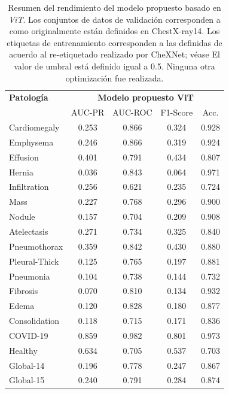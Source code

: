 {\begin{table}[tb]
    \centering
    \begin{tabular}{|l||c|c|c|c|}
        \hline
    {\bf Patología} 	    	&	\multicolumn{4}{c|}{\bf Modelo propuesto ViT}  \\
    \cline{2-5}
                        &	AUC-PR	&	AUC-ROC 	& F1-Score  & Acc.  \\
        \hline \hline
        Cardiomegaly	&	0.253	&	0.866	&	0.324	&	0.928	\\
        Emphysema	    &	0.246	&	0.866	&	0.319	&	0.924	\\
        Effusion	    &	0.401	&	0.791	&	0.434	&	0.807	\\
        Hernia	        &	0.036	&	0.843	&	0.064	&	0.971	\\
        Infiltration	&	0.256	&	0.621	&	0.235	&	0.724	\\
        Mass	        &	0.227	&	0.768	&	0.296	&	0.900	\\
        Nodule	        &	0.157	&	0.704	&	0.209	&	0.908	\\
        Atelectasis	    &	0.271	&	0.734	&	0.325	&	0.840	\\
        Pneumothorax	&	0.359	&	0.842	&	0.430	&	0.880	\\
        Pleural-Thick	&	0.125	&	0.765	&	0.197	&	0.881	\\
        Pneumonia	    &	0.104	&	0.738	&	0.144	&	0.732	\\
        Fibrosis	    &	0.070	&	0.810	&	0.134	&	0.932	\\
        Edema	        &	0.120	&	0.828	&	0.180	&	0.877	\\
        Consolidation	&	0.118	&	0.715	&	0.171	&	0.836	\\
        \hline
        COVID-19	    &	0.859	&	0.982	&	0.801	&	0.973	\\
        Healthy	        &	0.634	&	0.705	&	0.537	&	0.703	\\
        \hline\hline
        Global-14	    &	0.196	&	0.778	&	0.247	&	0.867	\\
        Global-15	    &	0.240	&	0.791	&	0.284	&	0.874	\\
    \hline
    \end{tabular}
    \caption{Resumen del rendimiento del modelo propuesto basado en \textit{ViT}.
            Los conjuntos de datos de validación corresponden a como originalmente
            están definidos en ChestX-ray14. Los etiquetas de entrenamiento corresponden a las
            definidas de acuerdo al re-etiquetado realizado por CheXNet; véase \cite{rajpurkar2018deep}
            El valor de umbral está definido igual a 0.5. Ninguna otra optimización fue realizada.}
    \label{table:vit-model-covid}
\end{table}

}
